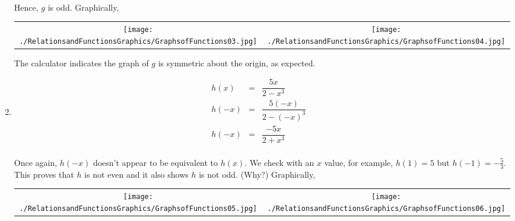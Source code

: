 \begin{ex}
\begin{enumerate}
\[\begin{array}{rclr}
\end{array} \]

\setlength{\extrarowheight}{2pt}

Hence, $g$ is odd.  Graphically,

\begin{center}

\begin{tabular}{cc}

\texttt{[image: ./RelationsandFunctionsGraphics/GraphsofFunctions03.jpg]} \hspace{.75in} & \texttt{[image: ./RelationsandFunctionsGraphics/GraphsofFunctions04.jpg]} \\

\end{tabular}

\end{center}

The calculator indicates the graph of $g$ is symmetric about the origin, as expected.

\setlength{\extrarowheight}{8pt}

\item  \[ \begin{array}{rclr}   

h(x) & = & \dfrac{5x}{2 - x^3} & \\ 
h(-x) & = & \dfrac{5(-x)}{2 - (-x)^3} & \\  
h(-x) & = & \dfrac{-5x}{2 + x^3} & \\  

\end{array} \]

\setlength{\extrarowheight}{2pt}

Once again, $h(-x)$ doesn't appear to be equivalent to $h(x)$.  We check with an $x$ value, for example, $h(1) = 5$ but $h(-1) = -\frac{5}{3}$.  This proves that $h$ is not even and it also shows $h$ is not odd. (Why?)  Graphically,

\begin{center}

\begin{tabular}{cc}

\texttt{[image: ./RelationsandFunctionsGraphics/GraphsofFunctions05.jpg]} \hspace{.75in} & \texttt{[image: ./RelationsandFunctionsGraphics/GraphsofFunctions06.jpg]} \\

\end{tabular}


\end{center}
\end{enumerate}
\end{ex}
